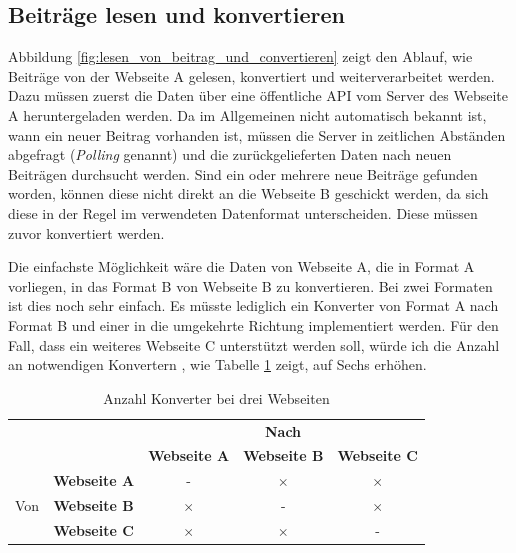 \subsection{Beiträge lesen und konvertieren} %
\label{sub:beiträge_lesen_und_konvertieren}

Abbildung \ref{fig:lesen_von_beitrag_und_convertieren} zeigt den Ablauf, wie Beiträge von der Webseite A gelesen, konvertiert und weiterverarbeitet werden. Dazu müssen zuerst die Daten über eine öffentliche API vom Server des Webseite A heruntergeladen werden. Da im Allgemeinen nicht automatisch bekannt ist, wann ein neuer Beitrag vorhanden ist, müssen die Server in zeitlichen Abständen abgefragt (\emph{Polling} genannt) und die zurückgelieferten Daten nach neuen Beiträgen durchsucht werden. Sind ein oder mehrere neue Beiträge gefunden worden, können diese nicht direkt an die Webseite B geschickt werden, da sich diese in der Regel im verwendeten Datenformat unterscheiden. Diese müssen zuvor konvertiert werden.

Die einfachste Möglichkeit wäre die Daten von Webseite A, die in Format A vorliegen, in das Format B von Webseite B zu konvertieren. Bei zwei Formaten ist dies noch sehr einfach. Es müsste lediglich ein Konverter von Format A nach Format B und einer in die umgekehrte Richtung implementiert werden. Für den Fall, dass ein weiteres Webseite C unterstützt werden soll, würde ich die Anzahl an notwendigen Konvertern , wie Tabelle \ref{tbl:anzahl_konvertern_bei_drei_netzwerken} zeigt, auf Sechs erhöhen.

\begin{table}[ht]
    \centering
    \caption{Anzahl Konverter bei drei Webseiten}
    
    \begin{tabular}{c|c|c|c|c}
        \multicolumn{2}{c|}{\multirow{2}{*}{}} & 
        \multicolumn{3}{|c}{\textbf{Nach}}   \\ 
        \cline{3-5} 

        \multicolumn{2}{c|}{} & 
        \textbf{Webseite A} & 
        \textbf{Webseite B} & 
        \textbf{Webseite C} \\ 
        \hline

        \multirow{3}{*}{Von} & 
        \textbf{Webseite A} & 
        -&            
        $ \times $ &            
        $ \times $ \\ 
        \cline{2-5} 

        & 
        \textbf{Webseite B} &            
        $ \times $ &            
        -&            
        $ \times $ \\ 
        \cline{2-5} 
         
        & 
        \textbf{Webseite C} &            
        $ \times $ &            
        $ \times $ &            
        -\\
    \end{tabular}
    \label{tbl:anzahl_konvertern_bei_drei_netzwerken}
\end{table}

